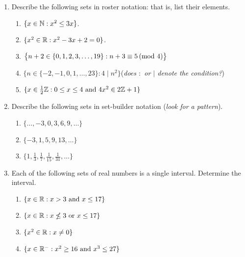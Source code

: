 % 


\begin{exercises}{}{}

\begin{enumerate}
  \item Describe the following sets in roster notation: that is, list their elements.
		\begin{enumerate}
	  	\item $\{x\in\mathbb{N}:x^2\le 3x\}$.
	  	\item $\{x^2\in\mathbb{R}:x^2-3x+2=0\}$.
	  	\item $\bigl\{n+2\in\{0,1,2,3,\ldots,19\}:n+3\equiv 5\negthickspace\pmod{4}\bigr\}$
	  	\item $\bigl\{n\in\{-2,-1,0,1,\ldots,23\}:4\mid n^2\bigr\}$\hfill (\emph{does $:$ or  $|$ denote the condition?})
	  	\item $\{x\in \frac 12\mathbb{Z}: 0\le x\le 4\text{ and }4x^2\in 2\mathbb{Z}+1\}$
		\end{enumerate}
		
	\item Describe the following sets in set-builder notation (\emph{look for a pattern}).
		\begin{enumerate}
	  	\item $\{\ldots,-3,0,3,6,9,\ldots\}$
	  	\item $\{-3,1,5,9,13,\ldots\}$
	  	\item $\{1,\frac 13,\frac 17,\frac 1{15},\frac 1{31},\ldots\}$
	  \end{enumerate}

  \item Each of the following sets of real numbers is a single interval. Determine the interval.
		\begin{enumerate}
	  	\item $\{x\in\mathbb{R}:x>3\text{ and }x\le 17\}$
	  	\item $\{x\in\mathbb{R}:x\nleq 3\text{ or }x\le 17\}$
	  	\item $\{x^2\in\mathbb{R}:x\neq 0\}$
	  	\item $\{x\in\mathbb{R}^-:x^2\ge 16\text{ and }x^3\le 27\}$
		\end{enumerate}
		

\end{enumerate}
\end{exercises}
